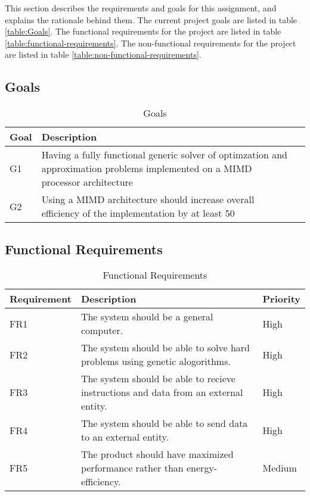 This section describes the requirements and goals for this assignment, and explains the rationale behind them.
The current project goals are listed in table \vref{table:Goals}.
The functional requirements for the project are listed in table \vref{table:functional-requirements}.
The non-functional requirements for the project are listed in table \vref{table:non-functional-requirements}.
\subsection{Goals}
\begin{table}[H]
 \begin{center}
 \begin{tabular}{| l | p{7cm} | l |}
 \hline
 Goal& Description\\
 \hline
 G1 & Having a fully functional generic solver of optimzation and approximation problems implemented on a MIMD processor architecture  \\
 G2 & Using a MIMD architecture should increase overall efficiency of the implementation by at least 50%
 \hline
 \end{tabular}
 \caption{Goals}
 \label{table:Goals}
 \end{center}
 \end{table}
 \subsection{Functional Requirements}

 \begin{table}[H]
 \begin{center}
 \begin{tabular}{| l | p{7cm} | l |}
 \hline
 Requirement & Description & Priority\\
 \hline
 FR1 & The system should be a general computer. & High \\
 FR2 & The system should be able to solve hard problems using genetic alogorithms. & High \\
 FR3 & The system should be able to recieve instructions and data from an external entity. & High \\
 FR4 & The system should be able to send data to an external entity. & High \\
 FR5 & The product should have maximized performance rather than energy-efficiency. & Medium \\
 \hline
 \end{tabular}
 \caption{Functional Requirements}
 \label{table:functional-requirements}
 \end{center}
 \end{table}

